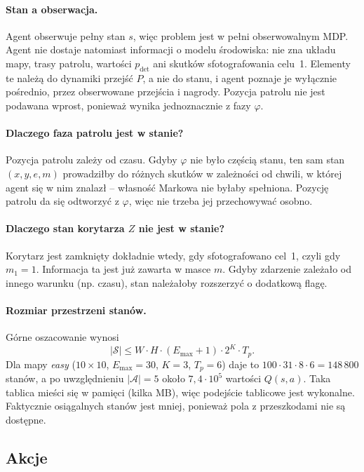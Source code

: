\paragraph{Stan a obserwacja.} Agent obserwuje pełny stan $s$, więc problem
jest w pełni obserwowalnym MDP. Agent nie dostaje natomiast informacji
o modelu środowiska: nie zna układu mapy, trasy patrolu, wartości
$p_{\text{det}}$ ani skutków sfotografowania celu~1. Elementy te należą do
dynamiki przejść $P$, a nie do stanu, i agent poznaje je wyłącznie pośrednio,
przez obserwowane przejścia i nagrody. Pozycja patrolu nie jest podawana
wprost, ponieważ wynika jednoznacznie z fazy $\varphi$.

\paragraph{Dlaczego faza patrolu jest w stanie?} Pozycja patrolu zależy od
czasu. Gdyby $\varphi$ nie było częścią stanu, ten sam stan $(x,y,e,m)$
prowadziłby do różnych skutków w zależności od chwili, w której agent się
w nim znalazł -- własność Markowa nie byłaby spełniona. Pozycję patrolu da się
odtworzyć z $\varphi$, więc nie trzeba jej przechowywać osobno.

\paragraph{Dlaczego stan korytarza $Z$ nie jest w stanie?} Korytarz jest
zamknięty dokładnie wtedy, gdy sfotografowano cel~1, czyli gdy $m_1 = 1$.
Informacja ta jest już zawarta w masce $m$. Gdyby zdarzenie zależało od innego
warunku (np. czasu), stan należałoby rozszerzyć o dodatkową flagę.

\paragraph{Rozmiar przestrzeni stanów.} Górne oszacowanie wynosi
\begin{equation}
  |\mathcal{S}| \le W \cdot H \cdot (E_{\max}+1) \cdot 2^K \cdot T_p .
\end{equation}
Dla mapy \emph{easy} ($10\times10$, $E_{\max}=30$, $K=3$, $T_p=6$) daje to
$100 \cdot 31 \cdot 8 \cdot 6 = 148\,800$ stanów, a po uwzględnieniu
$|\mathcal{A}| = 5$ około $7{,}4 \cdot 10^5$ wartości $Q(s,a)$. Taka tablica
mieści się w pamięci (kilka MB), więc podejście tablicowe jest wykonalne.
Faktycznie osiągalnych stanów jest mniej, ponieważ pola z przeszkodami
nie są dostępne.

\subsection{Akcje}

